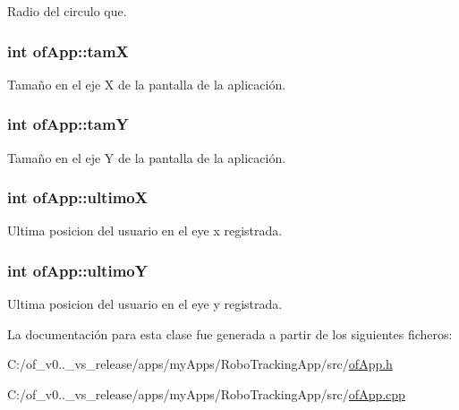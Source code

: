 Radio del circulo que. 

\hypertarget{classof_app_a07b648bd42ef7fda31bf208ccd18d5f8}{}
\subsubsection[{tam\+X}]{\setlength{\rightskip}{0pt plus 5cm}int of\+App\+::tam\+X\hspace{0.3cm}{\ttfamily [private]}}\label{classof_app_a07b648bd42ef7fda31bf208ccd18d5f8}


Tamaño en el eje X de la pantalla de la aplicación. 

\hypertarget{classof_app_ac1e9d00b0014a47490688c3b298a67c9}{}
\subsubsection[{tam\+Y}]{\setlength{\rightskip}{0pt plus 5cm}int of\+App\+::tam\+Y\hspace{0.3cm}{\ttfamily [private]}}\label{classof_app_ac1e9d00b0014a47490688c3b298a67c9}


Tamaño en el eje Y de la pantalla de la aplicación. 

\hypertarget{classof_app_a6dc30422836aa52bb36cd601c5250ba5}{}
\subsubsection[{ultimo\+X}]{\setlength{\rightskip}{0pt plus 5cm}int of\+App\+::ultimo\+X\hspace{0.3cm}{\ttfamily [private]}}\label{classof_app_a6dc30422836aa52bb36cd601c5250ba5}


Ultima posicion del usuario en el eye x registrada. 

\hypertarget{classof_app_a0d785c36d4483946c4e43b7a1cecffe9}{}
\subsubsection[{ultimo\+Y}]{\setlength{\rightskip}{0pt plus 5cm}int of\+App\+::ultimo\+Y\hspace{0.3cm}{\ttfamily [private]}}\label{classof_app_a0d785c36d4483946c4e43b7a1cecffe9}


Ultima posicion del usuario en el eye y registrada. 



La documentación para esta clase fue generada a partir de los siguientes ficheros\+:\begin{DoxyCompactItemize}
\item 
C\+:/of\+\_\+v0..\+\_\+vs\+\_\+release/apps/my\+Apps/\+Robo\+Tracking\+App/src/\hyperlink{of_app_8h}{of\+App.\+h}\item 
C\+:/of\+\_\+v0..\+\_\+vs\+\_\+release/apps/my\+Apps/\+Robo\+Tracking\+App/src/\hyperlink{of_app_8cpp}{of\+App.\+cpp}\end{DoxyCompactItemize}
